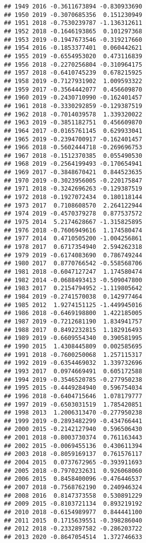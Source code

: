 \documentclass[
]{article}
\begin{document}
\begin{verbatim}
## 1949 2016 -0.3611673894 -0.830933690
## 1950 2019 -0.3070685356  0.151230949
## 1951 2018 -0.7530239787 -1.136312611
## 1952 2018 -0.1646193865  0.101297368
## 1953 2019 -0.1947673546 -0.319217660
## 1954 2016 -0.1853377401  0.060442621
## 1955 2019 -0.6554953020  0.473116839
## 1956 2018 -0.2270256804 -0.310964175
## 1957 2018 -0.6410745239  0.678215925
## 1958 2019 -0.7127931902  1.009593322
## 1959 2017 -0.3564442077  0.456609870
## 1960 2019 -0.2430710990 -0.162401457
## 1961 2018 -0.3330292859 -0.129387519
## 1962 2018 -0.7014039578  1.339320022
## 1963 2019 -0.3851182751  0.456609870
## 1964 2017 -0.0165761145  0.629933041
## 1965 2019 -0.2394700917 -0.162401457
## 1966 2018 -0.5602444718 -0.269696753
## 1967 2018 -0.1512370385  0.055490530
## 1968 2019 -0.2564199493 -0.170654941
## 1969 2017 -0.3848670421  0.844523635
## 1970 2019 -0.3023956005 -0.220175847
## 1971 2018 -0.3242696263 -0.129387519
## 1972 2018 -0.1927072434  0.180118144
## 1973 2017  0.7108608570  2.264122944
## 1974 2019 -0.4570379278  0.877537572
## 1975 2014  5.2174628667 -1.315825895
## 1976 2018 -0.7606949616  1.174580474
## 1977 2014  0.4710505200 -1.004256861
## 1978 2017  0.6717354940  2.594262318
## 1979 2019 -0.6174083690  0.786749244
## 1980 2017  0.8770766542 -0.558568706
## 1981 2018 -0.6047127247  1.174580474
## 1982 2014 -0.0688493413 -0.509047800
## 1983 2017  0.2154794952 -1.119805642
## 1984 2019 -0.2741570038  0.142977464
## 1985 2012  1.9274151125 -1.449945016
## 1986 2018 -0.6469198800  1.422185005
## 1987 2019 -0.7212681190  1.834941757
## 1988 2017  0.8492232815  1.182916493
## 1989 2019 -0.6609554340  0.390581995
## 1990 2015  1.4308445809  0.002585695
## 1991 2018 -0.7600250068  1.257115317
## 1992 2019 -0.6354469032  1.339732696
## 1993 2017  0.0974669491  0.605172588
## 1994 2019 -0.3546520785 -0.277950238
## 1995 2015 -0.4449284940  0.596754034
## 1996 2018 -0.6404715646  1.078179777
## 1997 2019 -0.6503031519  1.785420851
## 1998 2013  1.2006313470 -0.277950238
## 1999 2019 -0.2893482299 -0.434766441
## 2000 2015 -0.2142127940  0.596506430
## 2001 2018 -0.8003730374  0.761163443
## 2002 2015 -0.0069455136  0.430611394
## 2003 2018 -0.8059169137  0.761576117
## 2004 2015  0.0737672965 -0.393911693
## 2005 2018 -0.7970232631  0.926068060
## 2006 2015  0.8458400096 -0.476446537
## 2007 2018 -0.7568762190  0.240946324
## 2008 2016  0.8147373558  0.530891229
## 2009 2015 -0.8103721134  0.893219192
## 2010 2018 -0.6154989977  0.844441100
## 2011 2015  0.1715639551 -0.398286040
## 2012 2018 -0.2332897582 -0.286203722
## 2013 2020 -0.8647054514  1.372746633

\end{verbatim}
\end{document}
